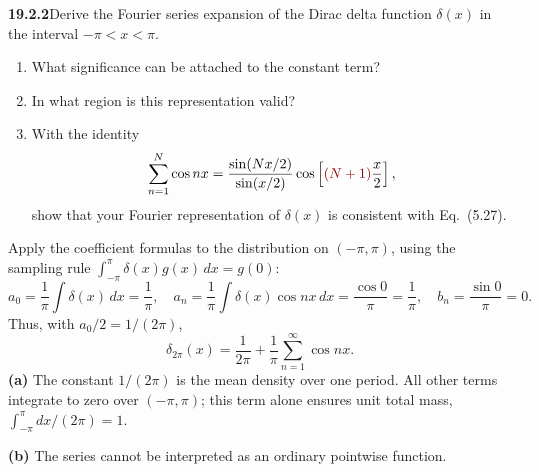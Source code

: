 \par\bigskip
\noindent\textbf{19.2.2}\quad Derive the Fourier series expansion
of the Dirac delta function $\delta(x)$ in the interval
$-\pi<x<\pi$.
\begin{enumerate}
\item[(a)] What significance can be attached to the constant term?
\item[(b)] In what region is this representation valid?
\item[(c)] With the identity
\[
\sum_{n=1}^{N}\cos nx=\frac{\sin(Nx/2)}{\sin(x/2)}
\cos\left[\erratum{(N+1)}\frac{x}{2}\right],
\]
show that your Fourier representation of $\delta(x)$ is consistent
with Eq.~(5.27).
\end{enumerate}
\solution
Apply the coefficient formulas to the distribution on $(-\pi,\pi)$,
using the sampling rule $\int_{-\pi}^{\pi}\delta(x)g(x)\,dx=g(0)$:
\[
a_0=\frac1\pi\int\delta(x)\,dx=\frac1\pi,
\quad a_n=\frac1\pi\int\delta(x)\cos nx\,dx=\frac{\cos0}\pi=\frac1\pi,
\quad b_n=\frac{\sin0}\pi=0.
\]
Thus, with $a_0/2=1/(2\pi)$,
\[
\boxed{\delta_{2\pi}(x)=\frac1{2\pi}
+\frac1\pi\sum_{n=1}^{\infty}\cos nx.}
\]
\textbf{(a)} The constant $1/(2\pi)$ is the mean density over one
period. All other terms integrate to zero over $(-\pi,\pi)$; this term
alone ensures unit total mass, $\int_{-\pi}^{\pi}dx/(2\pi)=1$.

\textbf{(b)} 
The series cannot be interpreted as an ordinary pointwise function.

